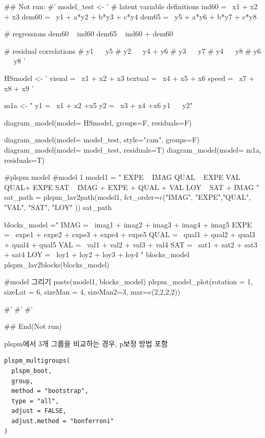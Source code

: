 \documentclass[a4paper]{book}
\begin{document}
\begin{Examples}
\begin{ExampleCode}
\#\# Not run: 
#'
model_test <- '
  # latent variable definitions
     ind60 =~ x1 + x2 + x3
     dem60 =~ y1 + a*y2 + b*y3 + c*y4
     dem65 =~ y5 + a*y6 + b*y7 + c*y8

  # regressions
    dem60 ~ ind60
    dem65 ~ ind60 + dem60

  # residual correlations
    # y1 ~~ y5
    # y2 ~~ y4 + y6
    # y3 ~~ y7
    # y4 ~~ y8
    # y6 ~~ y8
'

HSmodel <- ' visual  =~ x1 + x2 + x3
             textual =~ x4 + x5 + x6
             speed   =~ x7 + x8 + x9 '


m1a <- "
y1 =~ x1 + x2 +x5
y2 =~ x3 + x4 +x6
y1 ~~ y2"

diagram_model(model= HSmodel, groups=F,  residuals=F)

diagram_model(model= model_test, style="ram", groups=F)
diagram_model(model= model_test, residuals=T)
diagram_model(model= m1a, residuals=T)


#plspm model
#model 1
model1 = "
EXPE ~ IMAG
QUAL ~ EXPE
VAL ~  QUAL+ EXPE
SAT ~ IMAG + EXPE + QUAL + VAL
LOY ~ SAT + IMAG
"
sat_path = plspm_lav2path(model1,
                          fct_order=c("IMAG", "EXPE","QUAL", "VAL", "SAT", "LOY" ))
sat_path

blocks_model ="
IMAG =~ imag1 + imag2 + imag3 + imag4 + imag5
EXPE =~ expe1 + expe2 + expe3 + expe4 + expe5
QUAL =~ qual1 + qual2 + qual3 + qual4 + qual5
VAL =~ val1 + val2 + val3 + val4
SAT =~ sat1 + sat2 + sat3 + sat4
LOY =~ loy1 + loy2 + loy3 + loy4
"
blocks_model
plspm_lav2blocks(blocks_model)

#model 그리기
paste(model1, blocks_model)%
  plspm_model_plot(rotation = 1, sizeLat = 6, sizeMan = 4, sizeMan2=3,
                mar=c(2,2,2,2))

#'
#'
#'

## End(Not run)

\end{ExampleCode}
\end{Examples}
%
\begin{Description}
plspm에서 3개 그룹을 비교하는 경우, p보정 방법 포함
\end{Description}
%
\begin{Usage}
\begin{verbatim}
plspm_multigroups(
  plspm_boot,
  group,
  method = "bootstrap",
  type = "all",
  adjust = FALSE,
  adjust.method = "bonferroni"
)
\end{verbatim}
\end{Usage}
\end{document}
